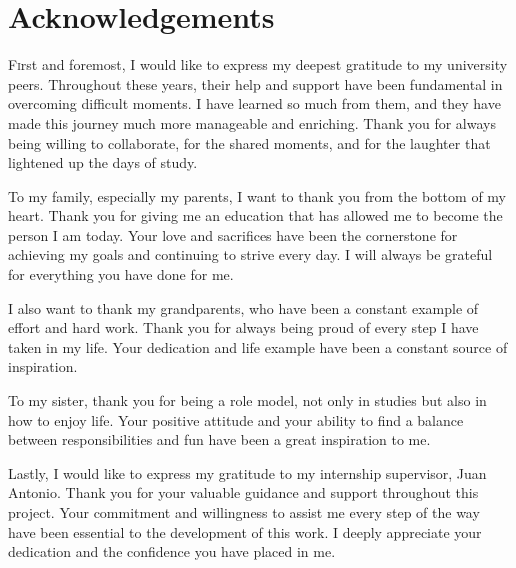 \chapter*{Acknowledgements}
\pagestyle{empty}

\lettrine[lraise=-0.1, lines=2, loversize=0.25]{F}{i}rst and foremost, I would like to express my deepest gratitude to my university peers. Throughout these years, their help and support have been fundamental in overcoming difficult moments. I have learned so much from them, and they have made this journey much more manageable and enriching. Thank you for always being willing to collaborate, for the shared moments, and for the laughter that lightened up the days of study.

To my family, especially my parents, I want to thank you from the bottom of my heart. Thank you for giving me an education that has allowed me to become the person I am today. Your love and sacrifices have been the cornerstone for achieving my goals and continuing to strive every day. I will always be grateful for everything you have done for me.

I also want to thank my grandparents, who have been a constant example of effort and hard work. Thank you for always being proud of every step I have taken in my life. Your dedication and life example have been a constant source of inspiration.

To my sister, thank you for being a role model, not only in studies but also in how to enjoy life. Your positive attitude and your ability to find a balance between responsibilities and fun have been a great inspiration to me.

Lastly, I would like to express my gratitude to my internship supervisor, Juan Antonio. Thank you for your valuable guidance and support throughout this project. Your commitment and willingness to assist me every step of the way have been essential to the development of this work. I deeply appreciate your dedication and the confidence you have placed in me.


{}%
\vspace{-.3cm}
{}%